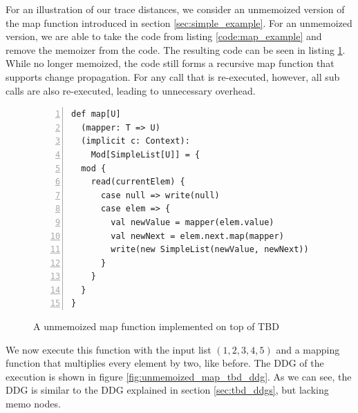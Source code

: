 For an illustration of our trace distances, we consider an unmemoized version of the map function introduced in section \ref{sec:simple_example}. For an unmemoized version, we are able to take the code from listing \ref{code:map_example} and remove the memoizer from the code. The resulting code can be seen in listing \ref{code:unmemoized_map_example}. While no longer memoized, the code still forms a recursive map function that supports change propagation. For any call that is re-executed, however, all sub calls are also re-executed, leading to unnecessary overhead.

\begin{figure}
\begin{lstlisting}[frame=single,basicstyle=\ttfamily,numbers=left,mathescape=true]
def map[U]
  (mapper: T => U)
  (implicit c: Context):
    Mod[SimpleList[U]] = {
  mod {
    read(currentElem) {
      case null => write(null)
      case elem => {
        val newValue = mapper(elem.value)
        val newNext = elem.next.map(mapper)
        write(new SimpleList(newValue, newNext))
      }
    }
  }
}
\end{lstlisting}
\caption{A unmemoized map function implemented on top of TBD}
\label{code:unmemoized_map_example}
\end{figure}

We now execute this function with the input list $(1, 2, 3, 4, 5)$ and a mapping function that multiplies every element by two, like before. The DDG of the execution is shown in figure \ref{fig:unmemoized_map_tbd_ddg}. As we can see, the DDG is similar to the DDG explained in section \ref{sec:tbd_ddgs}, but lacking memo nodes. 




